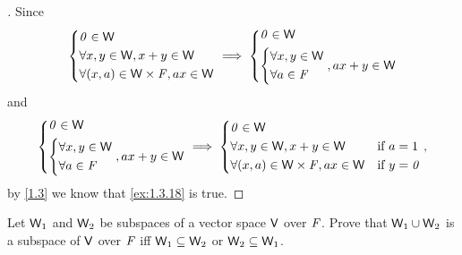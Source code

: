 \begin{proof}[]
  Since
  \[
    \begin{dcases}
      \mathit{0} \in \mathsf{W}                        \\
      \forall x, y \in \mathsf{W}, x + y \in \mathsf{W} \\
      \forall (x, a) \in \mathsf{W} \times \mathit{F}, ax \in \mathsf{W}
    \end{dcases} \implies \begin{dcases}
      \mathit{0} \in \mathsf{W} \\
      \begin{dcases}
        \forall x, y \in \mathsf{W} \\
        \forall a \in \mathit{F}
      \end{dcases}, ax + y \in \mathsf{W}
    \end{dcases}
  \]
  and
  \[
    \begin{dcases}
      \mathit{0} \in \mathsf{W} \\
      \begin{dcases}
        \forall x, y \in \mathsf{W} \\
        \forall a \in \mathit{F}
      \end{dcases}, ax + y \in \mathsf{W}
    \end{dcases} \implies \begin{dcases}
      \mathit{0} \in \mathsf{W}                                                      \\
      \forall x, y \in \mathsf{W}, x + y \in \mathsf{W}          & \text{if } a = 1   \\
      \forall (x, a) \in \mathsf{W} \times \mathit{F}, ax \in \mathsf{W} & \text{if } y = \mathit{0}
    \end{dcases},
  \]
  by \cref{1.3} we know that \cref{ex:1.3.18} is true.
\end{proof}

\begin{ex}\label{ex:1.3.19}
  Let \(\mathsf{W}_1\) and \(\mathsf{W}_2\) be subspaces of a vector space \(\mathsf{V}\) over \(\mathit{F}\).
  Prove that \(\mathsf{W}_1 \cup \mathsf{W}_2\) is a subspace of \(\mathsf{V}\) over \(\mathit{F}\) iff \(\mathsf{W}_1 \subseteq \mathsf{W}_2\) or \(\mathsf{W}_2 \subseteq \mathsf{W}_1\).
\end{ex}

